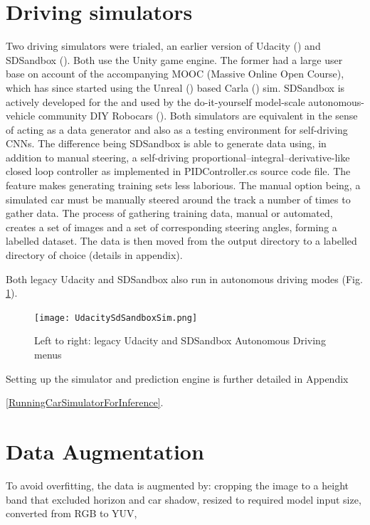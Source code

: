 \section{Driving simulators}

Two driving simulators were trialed, an earlier version of Udacity (\cite{UdacityCarSim}) and SDSandbox (\cite{SDSandboxSim}). Both use the Unity game engine. The former had a large user base on account of the accompanying MOOC (Massive Online Open Course), which has since started using the Unreal (\cite{unrealengine}) based Carla (\cite{Dosovitskiy17}) sim. SDSandbox is actively developed for the \cite{DonkeyCar2020} and used by the do-it-yourself model-scale autonomous-vehicle community DIY Robocars (\cite{DIYRobocars2020}).
Both simulators are equivalent in the sense of acting as a data generator and also as a testing environment for self-driving CNNs. The difference being SDSandbox is able to generate data using, in addition to manual steering, a self-driving proportional–integral–derivative-like closed loop controller as implemented in PIDController.cs source code file. The feature makes generating training sets less laborious. The manual option being, a simulated car must be manually steered around the track a number of times to gather data. The process of gathering training data, manual or automated, creates a set of images and a set of corresponding steering angles, forming a labelled dataset.
The data is then moved from the output directory to a labelled directory of choice (details in appendix).



Both legacy Udacity and SDSandbox also run in autonomous driving modes (Fig. \ref{fig:UdacitySdSandboxAutonomous}).

\begin{figure}[h!]
\centering
\texttt{[image: UdacitySdSandboxSim.png]}
\caption{Left to right: legacy Udacity and SDSandbox Autonomous Driving menus}
\label{fig:UdacitySdSandboxAutonomous}
\end{figure}

Setting up the simulator and prediction engine is further detailed in Appendix


\ref{RunningCarSimulatorForInference}.

\section{Data Augmentation}
To avoid overfitting, the data is augmented by: cropping the image to a height band that excluded horizon and car shadow, resized to required model input size, converted from RGB to YUV, 


